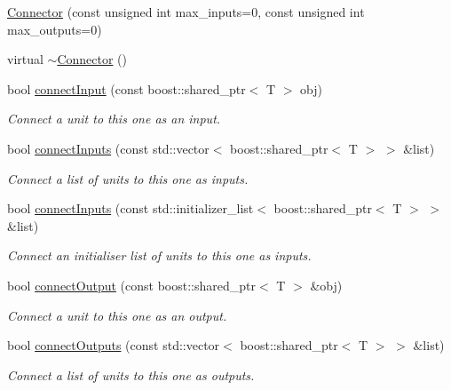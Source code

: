 \begin{DoxyCompactItemize}
\item 
\hyperlink{classcryomesh_1_1common_1_1Connector_a44c721dbd4fbf74f4b71528e440cbbac}{\-Connector} (const unsigned int max\-\_\-inputs=0, const unsigned int max\-\_\-outputs=0)
\item 
virtual \hyperlink{classcryomesh_1_1common_1_1Connector_adf967a4426097b1f8152711ba9e8edb7}{$\sim$\-Connector} ()
\item 
bool \hyperlink{classcryomesh_1_1common_1_1Connector_aa8eab10d81bfa921ad1341ad1fbc9a4d}{connect\-Input} (const boost\-::shared\-\_\-ptr$<$ \-T $>$ obj)
\begin{DoxyCompactList}\small\item\em \-Connect a unit to this one as an input. \end{DoxyCompactList}\item 
bool \hyperlink{classcryomesh_1_1common_1_1Connector_a94c014ba589b22076c84fd8394b96c8d}{connect\-Inputs} (const std\-::vector$<$ boost\-::shared\-\_\-ptr$<$ \-T $>$ $>$ \&list)
\begin{DoxyCompactList}\small\item\em \-Connect a list of units to this one as inputs. \end{DoxyCompactList}\item 
bool \hyperlink{classcryomesh_1_1common_1_1Connector_ad3287ece677524300b761e57ecb109de}{connect\-Inputs} (const std\-::initializer\-\_\-list$<$ boost\-::shared\-\_\-ptr$<$ \-T $>$ $>$ \&list)
\begin{DoxyCompactList}\small\item\em \-Connect an initialiser list of units to this one as inputs. \end{DoxyCompactList}\item 
bool \hyperlink{classcryomesh_1_1common_1_1Connector_a1fa0ff922e03cbb5654a2de468af9d41}{connect\-Output} (const boost\-::shared\-\_\-ptr$<$ \-T $>$ \&obj)
\begin{DoxyCompactList}\small\item\em \-Connect a unit to this one as an output. \end{DoxyCompactList}\item 
bool \hyperlink{classcryomesh_1_1common_1_1Connector_a4c962f5b074b2d81e4952cfbb11ab974}{connect\-Outputs} (const std\-::vector$<$ boost\-::shared\-\_\-ptr$<$ \-T $>$ $>$ \&list)
\begin{DoxyCompactList}\small\item\em \-Connect a list of units to this one as outputs. \end{DoxyCompactList}\item 

\end{DoxyCompactItemize}
